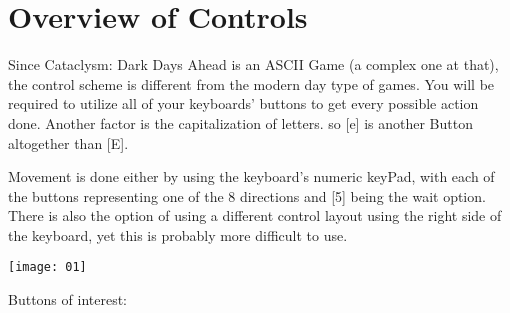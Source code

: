\chapter{Overview of Controls}
 
Since Cataclysm: Dark Days Ahead is an ASCII Game (a complex one at that), the control scheme is different from the modern day type of games. You will be required to utilize all of your keyboards' buttons to get every possible action done. Another factor is the capitalization of letters. so [e] is another Button altogether than [E].
 
Movement is done either by using the keyboard's numeric keyPad, with each of the buttons representing one of the 8 directions and [5] being the wait option. There is also the option of using a different control layout using the right side of the keyboard, yet this is probably more difficult to use.

\texttt{[image: 01]}

Buttons of interest:

